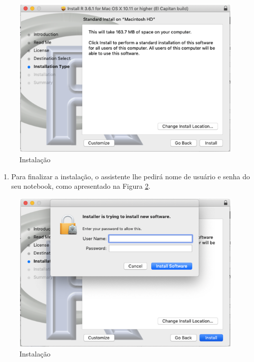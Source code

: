 \documentclass[
]{book}
\providecommand{\tightlist}{%
  \setlength{\itemsep}{0pt}\setlength{\parskip}{0pt}}
\begin{document}
\begin{figure}
\includegraphics[width=1\linewidth]{figures/mac_R_7} \caption{\label{fig:mac7} Instalação}\label{fig:mac7}
\end{figure}

\begin{enumerate}
\def\labelenumi{\arabic{enumi})}
\setcounter{enumi}{6}
\tightlist
\item
  Para finalizar a instalação, o assistente lhe pedirá nome de usuário e senha do seu notebook, como apresentado na Figura \ref{fig:mac8}.
\end{enumerate}

\begin{figure}
\includegraphics[width=1\linewidth]{figures/mac_R_8} \caption{\label{fig:mac8} Instalação}\label{fig:mac8}
\end{figure}
\end{document}
